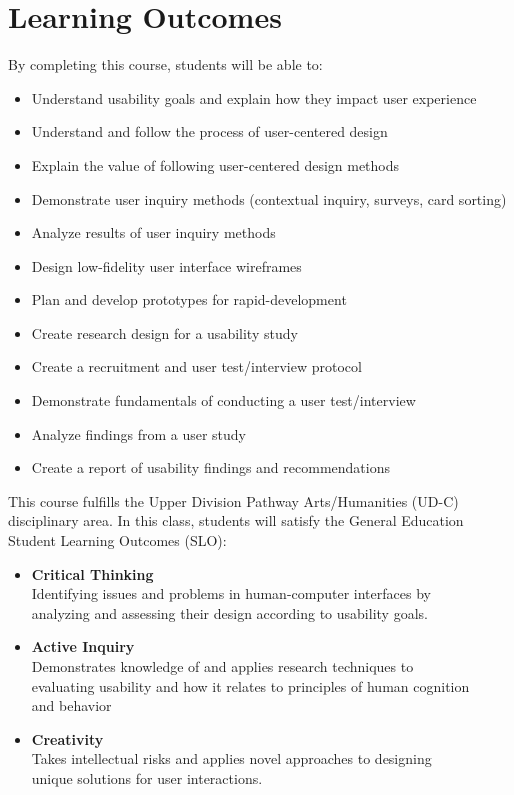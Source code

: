 \documentclass[12pt]{article}
\begin{document}
  \section*{Learning Outcomes}
  \noindent
  By completing this course, students will be able to:
  \begin{itemize}
    \item Understand usability goals and explain how they impact user experience
    \item Understand and follow the process of user-centered design
    \item Explain the value of following user-centered design methods
    \item Demonstrate user inquiry methods (contextual inquiry, surveys, card sorting)
    \item Analyze results of user inquiry methods
    \item Design low-fidelity user interface wireframes
    \item Plan and develop prototypes for rapid-development
    \item Create research design for a usability study 
    \item Create a recruitment and user test/interview protocol
    \item Demonstrate fundamentals of conducting a user test/interview
    \item Analyze findings from a user study
    \item Create a report of usability findings and recommendations
  \end{itemize}

  This course fulfills the Upper Division Pathway Arts/Humanities (UD-C) disciplinary area. In this class, students will satisfy the General Education Student Learning Outcomes (SLO):
  \begin{itemize}
    \item \textbf{Critical Thinking}\\
     Identifying issues and problems in human-computer interfaces by\\
     analyzing and assessing their design according to usability goals.
    \item \textbf{Active Inquiry}\\
     Demonstrates knowledge of and applies research techniques to\\
     evaluating usability and how it relates to principles of human cognition\\
     and behavior
    \item \textbf{Creativity}\\
    Takes intellectual risks and applies novel approaches to designing\\
    unique solutions for user interactions.
  \end{itemize}
\end{document}
